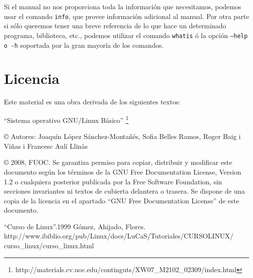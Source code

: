 \documentclass[12pt]{article}
\begin{document}
	

Si el manual no nos proporciona toda la información que necesitamos, podemos 
usar el comando \texttt{info}, que provee información adicional al manual. Por otra parte
si sólo queremos tener una breve referencia de lo que hace un determinado programa, 
biblioteca, etc., podemos utilizar el comando \texttt{whatis} ó la opción \texttt{--help o -h}
soportada por la gran mayoría de los comandos.


\section{Licencia}

Este material es una obra derivada de los siguientes textos:

``Sistema operativo GNU/Linux Básico'' \footnote{http://materials.cv.uoc.edu/continguts/XW07\_M2102\_02309/index.html}

© Autores: Joaquín López Sánchez-Montañés, Sofia Belles Ramos, Roger Baig i Viñas i Francesc Aulí Llinàs

© 2008, FUOC. Se garantiza permiso para copiar, distribuir y modificar este documento según los
términos de la GNU Free Documentation License, Version 1.2 o cualquiera posterior publicada por la
Free Software Foundation, sin secciones invariantes ni textos de cubierta delantera o trasera. Se dispone
de una copia de la licencia en el apartado ``GNU Free Documentation License'' de este documento.

\begin{thebibliography}{1}
 ``Curso de Linux''.1999 Gómez, Ahijado, Flores.\\ 
http://www.ibiblio.org/pub/Linux/docs/LuCaS/Tutoriales/CURSOLINUX/\\curso\_linux/curso\_linux.html
\end{thebibliography}
\end{document}
